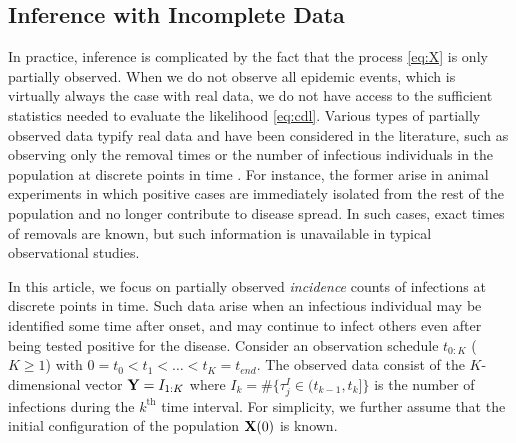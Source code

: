\documentclass[11pt]{article}
\begin{document}
	\subsection{Inference with Incomplete Data}
	\label{sec:iid}
	
	
	In practice, inference is complicated by the fact that the process \eqref{eq:X} is only partially observed. When we do not observe all epidemic events, which is virtually always the case with real data, we do not have access to the sufficient statistics needed to evaluate the likelihood \eqref{eq:cdl}. Various types of partially observed data typify real data and have been considered in the literature, such as observing only the removal times \cite{Gibson.1998, ONeill.1999} or the number of infectious individuals in the population at discrete points in time \cite{Fintzi.2017}. For instance, the former arise in animal experiments in which positive cases are immediately isolated from the rest of the population and no longer contribute to disease spread. In such cases, exact times of removals are known, but such information is unavailable in typical observational studies.
	
	In this article, we focus on partially observed \textit{incidence} counts of infections at discrete points in time. Such data arise when an infectious individual may be identified some time after onset, and may continue to infect others even after being tested positive for the disease. %
	Consider an observation schedule $t_{0:K}$ ($K \ge 1$) with $0 = t_0 < t_1 < \dots < t_K = t_{end}$. The observed data consist of the $K$-dimensional vector $\mathbf{Y} = I_{1:K}$ where $I_k = \#\{\tau^I_j \in (t_{k-1}, t_k]\}$ is the number of infections during the $k^{\text{th}}$ time interval.
	For simplicity, we further assume that the initial configuration of the population $\mathbf{X}(0)$ is known.
	
\end{document}
